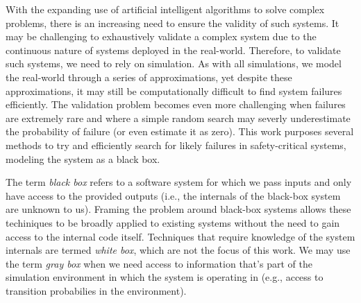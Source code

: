 
With the expanding use of artificial intelligent algorithms to solve complex problems, there is an increasing need to ensure the validity of such systems. %
It may be challenging to exhaustively validate a complex system due to the continuous nature of systems deployed in the real-world.
Therefore, to validate such systems, we need to rely on simulation.
As with all simulations, we model the real-world through a series of approximations, yet despite these approximations, it may still be computationally difficult to find system failures efficiently.
The validation problem becomes even more challenging when failures are extremely rare and where a simple random search may severly underestimate the probability of failure (or even estimate it as zero).
This work purposes several methods to try and efficiently search for likely failures in safety-critical systems, modeling the system as a black box.


The term \textit{black box} refers to a software system for which we pass inputs and only have access to the provided outputs (i.e., the internals of the black-box system are unknown to us).
Framing the problem around black-box systems allows these techiniques to be broadly applied to existing systems without the need to gain access to the internal code itself. 
Techniques that require knowledge of the system internals are termed \textit{white box}, which are not the focus of this work. 
We may use the term \textit{gray box} when we need access to information that's part of the simulation environment in which the system is operating in (e.g., access to transition probabilies in the environment).

